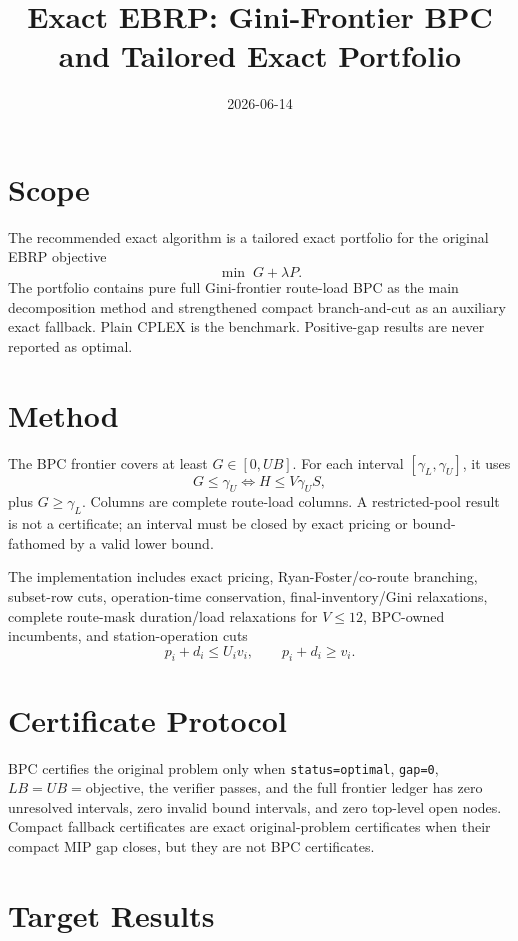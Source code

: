 \documentclass{article}
\title{Exact EBRP: Gini-Frontier BPC and Tailored Exact Portfolio}
\date{2026-06-14}
\begin{document}
\maketitle

\section{Scope}

The recommended exact algorithm is a tailored exact portfolio for the original EBRP objective
\[
\min\; G+\lambda P.
\]
The portfolio contains pure full Gini-frontier route-load BPC as the main decomposition method and strengthened compact branch-and-cut as an auxiliary exact fallback. Plain CPLEX is the benchmark. Positive-gap results are never reported as optimal.

\section{Method}

The BPC frontier covers at least $G\in[0,UB]$. For each interval $[\gamma_L,\gamma_U]$, it uses
\[
G\le \gamma_U \Longleftrightarrow H\le V\gamma_U S,
\]
plus $G\ge\gamma_L$. Columns are complete route-load columns. A restricted-pool result is not a certificate; an interval must be closed by exact pricing or bound-fathomed by a valid lower bound.

The implementation includes exact pricing, Ryan-Foster/co-route branching, subset-row cuts, operation-time conservation, final-inventory/Gini relaxations, complete route-mask duration/load relaxations for $V\le 12$, BPC-owned incumbents, and station-operation cuts
\[
p_i+d_i\le U_i v_i,\qquad p_i+d_i\ge v_i.
\]

\section{Certificate Protocol}

BPC certifies the original problem only when \texttt{status=optimal}, \texttt{gap=0}, $LB=UB=\text{objective}$, the verifier passes, and the full frontier ledger has zero unresolved intervals, zero invalid bound intervals, and zero top-level open nodes. Compact fallback certificates are exact original-problem certificates when their compact MIP gap closes, but they are not BPC certificates.

\section{Target Results}
\end{document}
